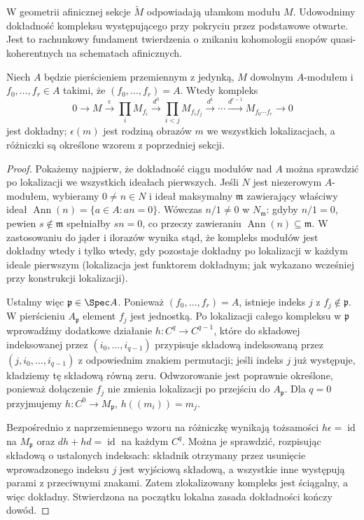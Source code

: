 W geometrii afinicznej sekcje $\widetilde M$ odpowiadają
ułamkom modułu $M$. Udowodnimy dokładność kompleksu
występującego przy pokryciu przez podstawowe otwarte.
Jest to rachunkowy fundament twierdzenia o znikaniu
kohomologii snopów quasi-koherentnych na schematach afinicznych.

\begin{twierdzenie}
\label{tw:affine-cech-exact}
Niech $A$ będzie pierścieniem przemiennym z jedynką,
$M$ dowolnym $A$-modułem i $f_0,\ldots,f_r\in A$
takimi, że $(f_0,\ldots,f_r)=A$. Wtedy kompleks
\[
0\longrightarrow M\xrightarrow{\epsilon}
\prod_iM_{f_i}\xrightarrow{d^0}
\prod_{i<j}M_{f_if_j}\xrightarrow{d^1}\cdots
\xrightarrow{d^{r-1}}M_{f_0\cdots f_r}\longrightarrow0
\]
jest dokładny; $\epsilon(m)$ jest rodziną obrazów
$m$ we wszystkich lokalizacjach, a różniczki są
określone wzorem z poprzedniej sekcji.
\end{twierdzenie}
\begin{proof}
Pokażemy najpierw, że dokładność ciągu modułów nad
$A$ można sprawdzić po lokalizacji we wszystkich
ideałach pierwszych. Jeśli $N$ jest niezerowym
$A$-modułem, wybieramy $0\ne n\in N$ i ideał
maksymalny $\mathfrak m$ zawierający właściwy ideał
$\operatorname{Ann}(n)=\{a\in A:an=0\}$.
Wówczas $n/1\ne0$ w $N_{\mathfrak m}$:
gdyby $n/1=0$, pewien $s\notin\mathfrak m$
spełniałby $sn=0$, co przeczy zawieraniu
$\operatorname{Ann}(n)\subseteq\mathfrak m$.
W zastosowaniu do jąder i ilorazów wynika stąd,
że kompleks modułów jest dokładny wtedy i tylko wtedy,
gdy pozostaje dokładny po lokalizacji w każdym
ideale pierwszym (lokalizacja jest funktorem dokładnym;
jak wykazano wcześniej przy konstrukcji lokalizacji).

Ustalmy więc $\mathfrak p\in\Spec A$. Ponieważ
$(f_0,\ldots,f_r)=A$, istnieje indeks $j$ z
$f_j\notin\mathfrak p$. W pierścieniu $A_{\mathfrak p}$
element $f_j$ jest jednostką. Po lokalizacji całego
kompleksu w $\mathfrak p$ wprowadźmy dodatkowe działanie
$h:C^q\to C^{q-1}$, które do składowej indeksowanej
przez $(i_0,\ldots,i_{q-1})$ przypisuje składową
indeksowaną przez $(j,i_0,\ldots,i_{q-1})$ z odpowiednim
znakiem permutacji; jeśli indeks $j$ już występuje,
kładziemy tę składową równą zeru. Odwzorowanie jest
poprawnie określone, ponieważ dołączenie $f_j$
nie zmienia lokalizacji po przejściu do $A_{\mathfrak p}$.
Dla $q=0$ przyjmujemy $h:C^0\to M_{\mathfrak p}$,
$h((m_i))=m_j$.

Bezpośrednio z naprzemiennego wzoru na różniczkę
wynikają tożsamości
$h\epsilon=\operatorname{id}$ na $M_{\mathfrak p}$
oraz $dh+hd=\operatorname{id}$ na każdym $C^q$.
Można je sprawdzić, rozpisując składową o ustalonych
indeksach: składnik otrzymany przez usunięcie
wprowadzonego indeksu $j$ jest wyjściową składową,
a wszystkie inne występują parami z przeciwnymi znakami.
Zatem zlokalizowany kompleks jest ściągalny, a więc
dokładny. Stwierdzona na początku lokalna zasada
dokładności kończy dowód.
\end{proof}

